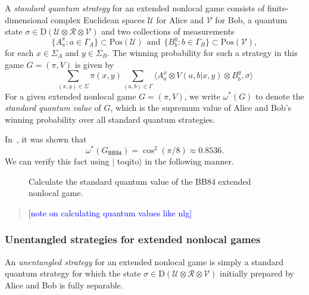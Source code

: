 \documentclass[nofootinbib,superscriptaddress,a4paper,twocolumn,longbibliography,floatfix,pra]{revtex4-2}
\newcommand{\comment}[1]{\begin{quote}\sf 
    \textcolor{blue}{[#1]}\end{quote}}
\renewcommand{\ip}[2]{\langle #1 , #2\rangle}
\newcommand{\setft}[1]{\mathrm{#1}}
\newcommand{\Density}{\setft{D}}
\newcommand{\Pos}{\setft{Pos}}
\newcommand{\toqitofont}{%
	\fontfamily{FiraSans}%
	\selectfont}
\newcommand{\toqito}{ $|${\toqitofont toqito}$\rangle$\xspace}
\newcommand{\V}{\mathcal{V}}
\newcommand{\U}{\mathcal{U}}
\newcommand{\R}{\mathcal{R}}
\def\BB84{\mathsf{BB84}}
\begin{document}
A \emph{standard quantum strategy} for an extended nonlocal game consists of
finite-dimensional complex Euclidean spaces $\U$ for Alice and $\V$ for Bob, a
quantum state $\sigma \in \Density(\U \otimes \R \otimes \V)$ and two
collections of measurements
\begin{equation*}
    \{A_a^x : a \in \Gamma_A\} \subset \Pos(\U)
    \ \ \text{and} \ \
    \{B_b^y : b \in \Gamma_B\} \subset \Pos(\V),
\end{equation*}
for each $x \in \Sigma_A$ and $y \in \Sigma_B$. The winning probability for
such a strategy in this game $G = (\pi, V)$ is given by
\begin{equation}
    \sum_{(x,y) \in \Sigma} \pi(x,y) \sum_{(a,b) \in \Gamma} \ip{A_a^x \otimes
    V(a,b|x,y) \otimes B_b^y}{\sigma}
\end{equation}
For a given extended nonlocal game $G = (\pi, V)$, we write $\omega^*(G)$ to
denote the \emph{standard quantum value} of $G$, which is the supremum value of
Alice and Bob's winning probability over all standard quantum strategies.

In~\cite{tomamichel2013monogamy}, it was shown that
\begin{equation}
    \omega^*(G_{\BB84}) = \cos^2(\pi/8) \approx 0.8536.
\end{equation}
We can verify this fact using \toqito in the following manner.
\begin{figure}[!htpb]
    \centering
            
    \caption{Calculate the standard quantum value of the BB84 extended nonlocal
    game.}
    \label{fig:bb84_game_quantum}
\end{figure}

\comment{note on calculating quantum values like nlg}

\subsubsection{Unentangled strategies for extended nonlocal games}
\label{sec:unentangled_strategies_for_extended_nonlocal_games}

An \emph{unentangled strategy} for an extended nonlocal game is simply a
standard quantum strategy for which the state $\sigma \in \Density(\U \otimes
\R \otimes \V)$ initially prepared by Alice and Bob is fully separable.
\\
\end{document}

